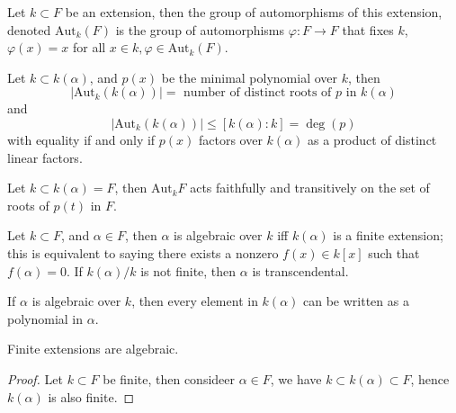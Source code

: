 \documentclass[openany]{book}
\newcommand{\aut}{\text{Aut}}
\begin{document}
\begin{defn}
    Let $k\subset F$ be an extension, then the group of automorphisms of this extension, denoted $\text{Aut}_k(F)$ is the group of automorphisms $\varphi:F\to F$ that fixes $k$, $\varphi(x)=x$ for all $x\in k, \varphi\in\text{Aut}_k(F)$.
\end{defn}

\begin{prop}
    Let $k\subset k(\alpha)$, and $p(x)$ be the minimal polynomial over $k$, then 
    \begin{equation*}
        |\text{Aut}_k(k(\alpha))|=\text{ number of distinct roots of $p$ in $k(\alpha)$}
    \end{equation*}
    and 
    \begin{equation*}
        |\text{Aut}_k(k(\alpha))|\leq [k(\alpha):k]=\deg(p)
    \end{equation*}
    with equality if and only if $p(x)$ factors over $k(\alpha)$ as a product of distinct linear factors.
\end{prop}

\begin{prop}
    Let $k\subset k(\alpha)=F$, then $\aut_kF$ acts faithfully and transitively on the set of roots of $p(t)$ in $F$. 
\end{prop}

\begin{defn}
    Let $k\subset F$, and $\alpha\in F$, then $\alpha$ is algebraic over $k$ iff $k(\alpha)$ is a finite extension; this is equivalent to saying there exists a nonzero $f(x)\in k[x]$ such that $f(\alpha)=0$. If $k(\alpha)/k$ is not finite, then $\alpha$ is transcendental.

    If $\alpha$ is algebraic over $k$, then every element in $k(\alpha)$ can be written as a polynomial in $\alpha$.
\end{defn}


\begin{prop}
    Finite extensions are algebraic.
\end{prop}
\begin{proof}
    Let $k\subset F$ be finite, then consideer $\alpha\in F$, we have $k\subset k(\alpha)\subset F$, hence $k(\alpha)$ is also finite.
\end{proof}
\end{document}
